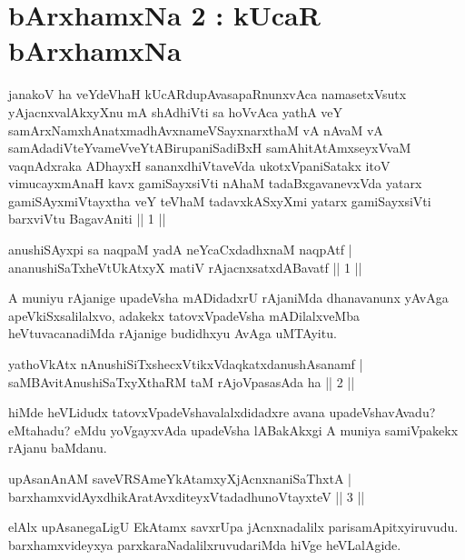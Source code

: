 \chapter{bArxhamxNa 2 : kUcaR bArxhamxNa}
\begin{kandikeshl}
janakoV ha veYdeVhaH kUcARdupAvasapaRnunxvAca namasetxV\s sutx \-yAjacnxvalAkxyXnu mA shAdhiVti sa hoVvAca yathA veY samArxNamxhAnatxmadhAvxnameVSayxnarxthaM vA nAvaM vA samAdadiVteYvameVveYtABirupaniSadiBxH samAhitAtAmxseyxVvaM vaqnAdxraka ADhayxH sananxdhiVtaveVda ukotxVpaniSatakx itoV vimucayxmAnaH kavx gamiSayxsiVti nAhaM tadaBxgavanevxVda yatarx gamiSAyxmiVtayxtha veY teV\s haM tadavxkASxyXmi yatarx gamiSayxsiVti barxviVtu BagavAniti || 1 ||
\end{kandikeshl}	
	
\begin{shl}
anushiSAyxpi sa naqpaM yadA neYcaCxdadhxnaM naqpAtf |\\
ananushiSaTxheVtUkAtxyX matiV rAjacnxsatxdA\s Bavatf \hfill || 1 || 
\end{shl}

\begin{artha}
A muniyu rAjanige upadeVsha mADidadxrU rAjaniMda dhanavanunx yAvAga apeVkiSxsalilalxvo, adakekx tatovxVpadeVsha mADilalxveMba heVtuvacanadiMda rAjanige budidhxyu AvAga uMTAyitu.
\end{artha}

\begin{shl}
yathoVkAtx nAnushiSiTxshecxVtikxVdaqkatxdanushAsanamf |\\
saMBAvitAnushiSaTxyXthaRM taM rAjoVpasasAda ha \hfill || 2 || 
\end{shl}

\begin{artha}
hiMde heVLidudx tatovxVpadeVshavalalxdidadxre avana upadeVsha\-\break vAvadu? eMtahadu? eMdu yoVgayxvAda upadeVsha lABakAkxgi A muniya samiVpakekx rAjanu baMdanu.
\end{artha}

\begin{shl}
upAsanAnAM saveVRSAmeYkAtamxyXjAcnxnaniSaThxtA |\\
barxhamxvidAyxdhikAratAvxditeyxVtadadhunoVtayxteV \hfill || 3 || 
\end{shl}

\begin{artha}
elAlx upAsanegaLigU EkAtamx savxrUpa jAcnxnadalilx parisamApitxyiruvudu. barxhamxvideyxya parxkaraNadalilxruvudariMda hiVge heVLalAgide.
\end{artha}

